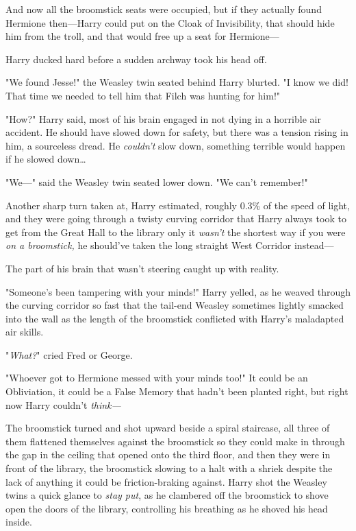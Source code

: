 And now all the broomstick seats were occupied, but if they actually found 
Hermione then---Harry could put on the Cloak of Invisibility, that should hide 
him from the troll, and that would free up a seat for Hermione---

Harry ducked hard before a sudden archway took his head off.

"We found Jesse!" the Weasley twin seated behind Harry blurted. "I know we did! 
That time we needed to tell him that Filch was hunting for him!"

"How?" Harry said, most of his brain engaged in not dying in a horrible air 
accident. He should have slowed down for safety, but there was a tension rising 
in him, a sourceless dread. He \emph{couldn't} slow down, something terrible 
would happen if he slowed down{\ldots}

"We---" said the Weasley twin seated lower down. "We can't remember!"

Another sharp turn taken at, Harry estimated, roughly 0.3\% of the speed of 
light, and they were going through a twisty curving corridor that Harry always 
took to get from the Great Hall to the library only it \emph{wasn't} the 
shortest way if you were \emph{on a broomstick,} he should've taken the long 
straight West Corridor instead---

The part of his brain that wasn't steering caught up with reality.

"Someone's been tampering with your minds!" Harry yelled, as he weaved through 
the curving corridor so fast that the tail-end Weasley sometimes lightly 
smacked into the wall as the length of the broomstick conflicted with Harry's 
maladapted air skills.

"\emph{What?}" cried Fred or George.

"Whoever got to Hermione messed with your minds too!" It could be an 
Obliviation, it could be a False Memory that hadn't been planted right, but 
right now Harry couldn't \emph{think---}

The broomstick turned and shot upward beside a spiral staircase, all three of 
them flattened themselves against the broomstick so they could make in through 
the gap in the ceiling that opened onto the third floor, and then they were in 
front of the library, the broomstick slowing to a halt with a shriek despite 
the lack of anything it could be friction-braking against. Harry shot the 
Weasley twins a quick glance to \emph{stay put}, as he clambered off the 
broomstick to shove open the doors of the library, controlling his breathing as 
he shoved his head inside.

